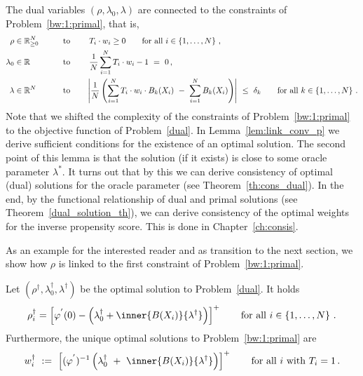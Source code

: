 \begin{remark}
  The dual variables $(\rho,\lambda_0,\lambda)$ are connected to the constraints of Problem~\ref{bw:1:primal}, that is,
  \begin{align*}
    \rho&\in\R^N_{\ge 0}
  &&
  \qquad
  \text{to}
  \qquad
  \ 
  T_i\cdot w_i\ge 0
  \qquad
  \text{for all}\ i\in \left\{ 1,\ldots,N \right\}
  \,,
  \\
    \lambda_0&\in\R
  &&
  \qquad
  \text{to}\qquad
  \ 
  \frac{1}{N}
  \sum_{i=1}^{N} 
  T_i\cdot w_i
  -
  1
  \ 
  =
  \ 
  0
  \,,
  \\
    \lambda&\in\R^N 
  &&
  \qquad
  \text{to}\qquad
    \left| 
      \frac{1}{N} 
      \left( 
      \sum_{i = 1}^{N} 
      T_i\cdot
      w_i
      \cdot
      B_k(X_i)
      \ 
      -
      \ 
      \sum_{i=1}^{N} 
      B_k(X_i)
      \right)
    \right|
    \ 
    \le 
    \ 
    \delta_k
    \qquad
    \text{for all}\ 
    k \in \left\{ 1, \ldots, N \right\}
    \,.
  \end{align*}
  Note that we shifted the complexity of the constraints of Problem~\ref{bw:1:primal} to the objective function of Problem~\ref{dual}. In Lemma~\ref{lem:link_conv_p} we derive sufficient conditions for the existence of an optimal solution. The second point of this lemma is that the solution (if it exists) is close to some oracle parameter $\lambda^*$. It turns out that by this we can derive consistency of optimal (dual) solutions for the oracle parameter (see Theorem~\ref{th:cons_dual}). In the end, by the functional relationship of dual and primal solutions (see Theorem~\ref{dual_solution_th}), we can derive consistency of the optimal weights for the inverse propensity score. This is done in Chapter~\ref{ch:consis}.
\end{remark}
As an example for the interested reader and as transition to the next section, we show how $\rho$ is linked to the first constraint of Problem~\ref{bw:1:primal}. 
\begin{lemma}
  \label{lem:simple_weights}
  Let 
$
(\rho^\dagger,\lambda_0^\dagger,\lambda^\dagger)
$
be the optimal solution to Problem~\ref{dual}.
It holds
\begin{align*}
  \rho_i^\dagger
  =
  \left[ 
  \varphi^{'}
  (0)
  -
  \left( 
    \lambda_0^\dagger + \inner{B(X_i)}{\lambda^\dagger}
  \right)
  \right]^+
\qquad
  \text{for all}\ i\in \left\{ 1,\ldots,N \right\}
  \,.
\end{align*}
Furthermore, the unique optimal solutions to Problem~\ref{bw:1:primal} are
\begin{align*}
  w^\dagger_i
  \ 
  :=
  \ 
  \left[
  (
  \varphi^{'}
  )^{-1}
  \left(
\lambda_0^\dagger
  \ 
+
  \ 
\inner
{B(X_i)}
{
\lambda^{\dagger}
}
  \right)
  \right]^+
  \qquad
  \text{for all}\ 
  i\ \text{with}\ T_i=1
  \,.
\end{align*}
\end{lemma}
